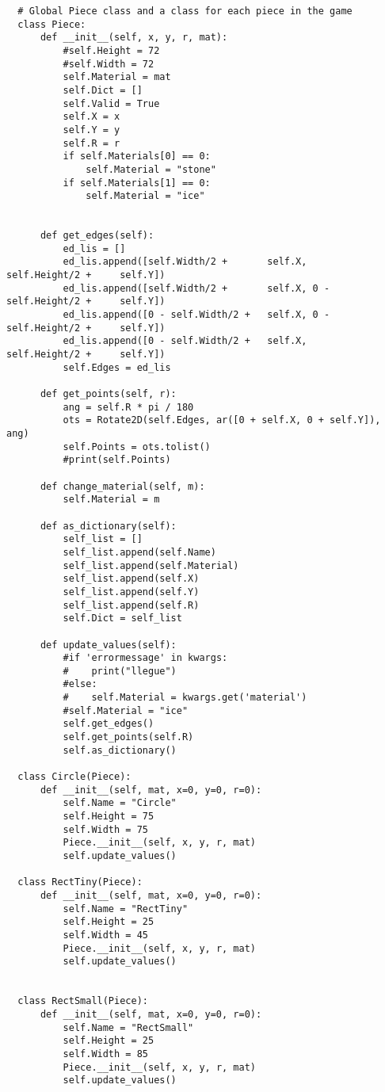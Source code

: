\begin{verbatim}
  # Global Piece class and a class for each piece in the game
  class Piece:
      def __init__(self, x, y, r, mat):
          #self.Height = 72
          #self.Width = 72
          self.Material = mat
          self.Dict = []
          self.Valid = True
          self.X = x
          self.Y = y
          self.R = r
          if self.Materials[0] == 0:
              self.Material = "stone"
          if self.Materials[1] == 0:
              self.Material = "ice"
          
      
      def get_edges(self):
          ed_lis = []
          ed_lis.append([self.Width/2 +       self.X,         self.Height/2 +     self.Y])
          ed_lis.append([self.Width/2 +       self.X, 0 -     self.Height/2 +     self.Y])
          ed_lis.append([0 - self.Width/2 +   self.X, 0 -     self.Height/2 +     self.Y])
          ed_lis.append([0 - self.Width/2 +   self.X,         self.Height/2 +     self.Y])
          self.Edges = ed_lis

      def get_points(self, r):
          ang = self.R * pi / 180
          ots = Rotate2D(self.Edges, ar([0 + self.X, 0 + self.Y]), ang)
          self.Points = ots.tolist()
          #print(self.Points)

      def change_material(self, m):
          self.Material = m

      def as_dictionary(self):
          self_list = []
          self_list.append(self.Name)
          self_list.append(self.Material)
          self_list.append(self.X)
          self_list.append(self.Y)
          self_list.append(self.R)
          self.Dict = self_list
          
      def update_values(self):
          #if 'errormessage' in kwargs:
          #    print("llegue")
          #else: 
          #    self.Material = kwargs.get('material')
          #self.Material = "ice"
          self.get_edges()
          self.get_points(self.R)
          self.as_dictionary()

  class Circle(Piece):
      def __init__(self, mat, x=0, y=0, r=0):
          self.Name = "Circle"
          self.Height = 75
          self.Width = 75
          Piece.__init__(self, x, y, r, mat)
          self.update_values()

  class RectTiny(Piece):
      def __init__(self, mat, x=0, y=0, r=0):
          self.Name = "RectTiny"
          self.Height = 25
          self.Width = 45
          Piece.__init__(self, x, y, r, mat)
          self.update_values()
      

  class RectSmall(Piece):
      def __init__(self, mat, x=0, y=0, r=0):
          self.Name = "RectSmall"
          self.Height = 25
          self.Width = 85
          Piece.__init__(self, x, y, r, mat)
          self.update_values()



\end{verbatim}
